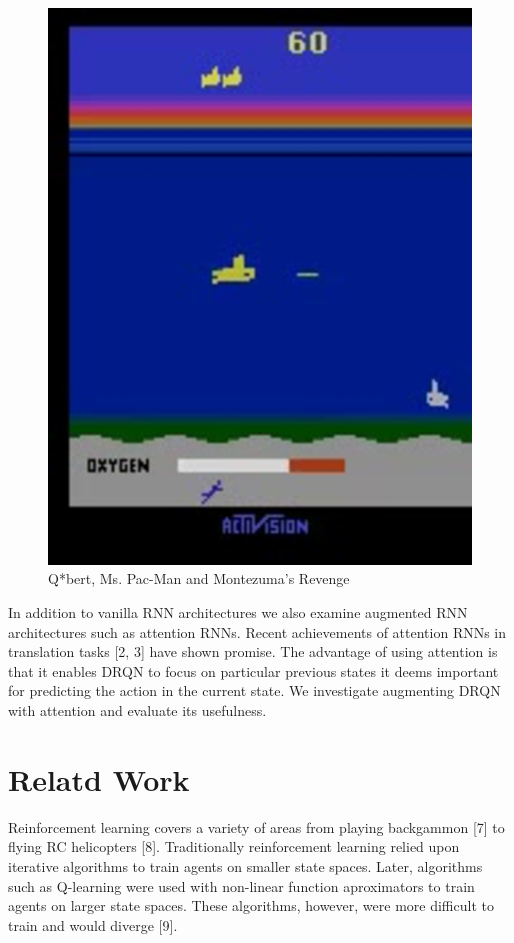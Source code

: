 \documentclass{article}
\begin{document}
\begin{figure}[h]
\begin{minipage}{0.8\textwidth}
            \centering
            \includegraphics[scale=0.15]{Seaquest}
        \end{minipage}
        \caption{Q*bert, Ms. Pac-Man and Montezuma's Revenge}
    \end{figure}


    In addition to vanilla RNN architectures we also examine augmented RNN
    architectures such as attention RNNs. Recent achievements of attention RNNs in
    translation tasks [2, 3] have shown promise. The advantage of using attention
    is that it enables DRQN to focus on particular previous states it deems
    important for predicting the action in the current state. We investigate
    augmenting DRQN with attention and evaluate its usefulness.

\section{Relatd Work}

Reinforcement learning covers a variety of areas from playing backgammon [7] to
flying RC helicopters [8]. Traditionally reinforcement learning relied upon
iterative algorithms to train agents on smaller state spaces. Later, algorithms
such as Q-learning were used with non-linear function aproximators to train agents
on larger state spaces. These algorithms, however, were more difficult to train
and would diverge [9].
\end{document}
